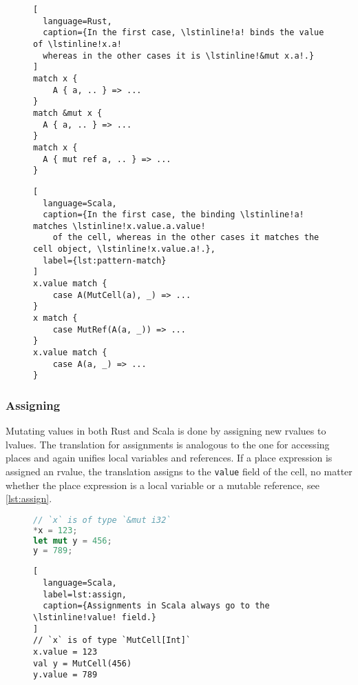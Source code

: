 \begin{figure}[htb]
\noindent\begin{minipage}[t]{.48\textwidth}
\begin{lstlisting}[
  language=Rust,
  caption={In the first case, \lstinline!a! binds the value of \lstinline!x.a!
  whereas in the other cases it is \lstinline!&mut x.a!.}
]
match x {
    A { a, .. } => ...
}
match &mut x {
  A { a, .. } => ...
}
match x {
  A { mut ref a, .. } => ...
}
\end{lstlisting}
\end{minipage}\hfill
\begin{minipage}[t]{.48\textwidth}
\begin{lstlisting}[
  language=Scala,
  caption={In the first case, the binding \lstinline!a! matches \lstinline!x.value.a.value!
    of the cell, whereas in the other cases it matches the cell object, \lstinline!x.value.a!.},
  label={lst:pattern-match}
]
x.value match {
    case A(MutCell(a), _) => ...
}
x match {
    case MutRef(A(a, _)) => ...
}
x.value match {
    case A(a, _) => ...
}
\end{lstlisting}
\end{minipage}
\end{figure}


\subsubsection{Assigning}

Mutating values in both Rust and Scala is done by assigning new rvalues to
lvalues. The translation for assignments is analogous to the one for accessing
places and again unifies local variables and references. If a place expression
is assigned an rvalue, the translation assigns to the
\passthrough{\lstinline!value!} field of the cell, no matter whether the place
expression is a local variable or a mutable reference, see \autoref{lst:assign}.

\begin{figure}
\noindent\begin{minipage}[t]{.48\textwidth}
\begin{lstlisting}[language=Rust, caption={Dereferencing and assigning in Rust.}]
// `x` is of type `&mut i32`
*x = 123;
let mut y = 456;
y = 789;
\end{lstlisting}
\end{minipage}\hfill
\begin{minipage}[t]{.48\textwidth}
\begin{lstlisting}[
  language=Scala,
  label=lst:assign,
  caption={Assignments in Scala always go to the \lstinline!value! field.}
]
// `x` is of type `MutCell[Int]`
x.value = 123
val y = MutCell(456)
y.value = 789
\end{lstlisting}
\end{minipage}
\end{figure}

